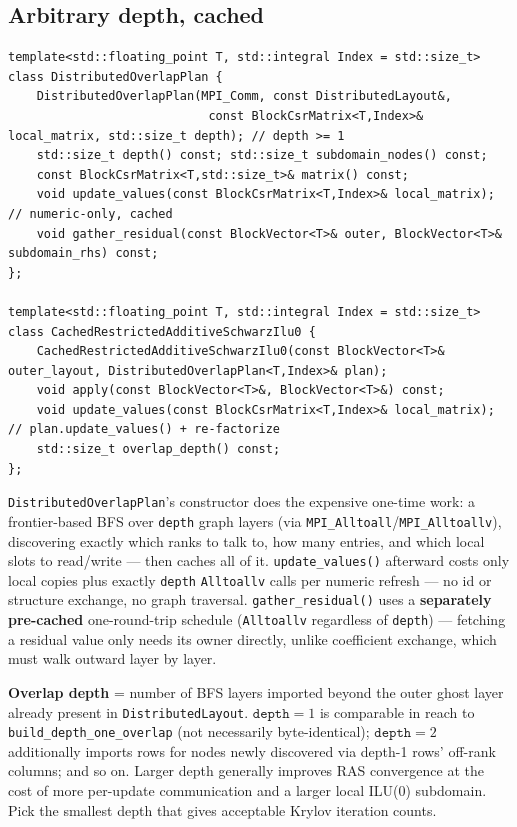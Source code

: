\documentclass[11pt,a4paper]{report}
\begin{document}
\subsection*{Arbitrary depth, cached}

\begin{lstlisting}
template<std::floating_point T, std::integral Index = std::size_t>
class DistributedOverlapPlan {
    DistributedOverlapPlan(MPI_Comm, const DistributedLayout&,
                            const BlockCsrMatrix<T,Index>& local_matrix, std::size_t depth); // depth >= 1
    std::size_t depth() const; std::size_t subdomain_nodes() const;
    const BlockCsrMatrix<T,std::size_t>& matrix() const;
    void update_values(const BlockCsrMatrix<T,Index>& local_matrix);   // numeric-only, cached
    void gather_residual(const BlockVector<T>& outer, BlockVector<T>& subdomain_rhs) const;
};

template<std::floating_point T, std::integral Index = std::size_t>
class CachedRestrictedAdditiveSchwarzIlu0 {
    CachedRestrictedAdditiveSchwarzIlu0(const BlockVector<T>& outer_layout, DistributedOverlapPlan<T,Index>& plan);
    void apply(const BlockVector<T>&, BlockVector<T>&) const;
    void update_values(const BlockCsrMatrix<T,Index>& local_matrix);  // plan.update_values() + re-factorize
    std::size_t overlap_depth() const;
};
\end{lstlisting}

\lstinline!DistributedOverlapPlan!'s constructor does the expensive one-time
work: a frontier-based BFS over \lstinline!depth! graph layers (via
\lstinline!MPI_Alltoall!/\lstinline!MPI_Alltoallv!), discovering exactly which ranks to
talk to, how many entries, and which local slots to read/write --- then
caches all of it. \lstinline!update_values()! afterward costs only local
copies plus exactly \lstinline!depth! \lstinline!Alltoallv! calls per numeric refresh
--- no id or structure exchange, no graph traversal. \lstinline!gather_residual()!
uses a \textbf{separately pre-cached} one-round-trip schedule
(\lstinline!Alltoallv! regardless of \lstinline!depth!) --- fetching a residual value
only needs its owner directly, unlike coefficient exchange, which must
walk outward layer by layer.

\textbf{Overlap depth} = number of BFS layers imported beyond the outer
ghost layer already present in \lstinline!DistributedLayout!. $\mathtt{depth}=1$
is comparable in reach to \lstinline!build_depth_one_overlap! (not necessarily
byte-identical); $\mathtt{depth}=2$ additionally imports rows for nodes
newly discovered via depth-1 rows' off-rank columns; and so on. Larger
depth generally improves RAS convergence at the cost of more
per-update communication and a larger local ILU(0) subdomain. Pick the
smallest depth that gives acceptable Krylov iteration counts.
\end{document}
